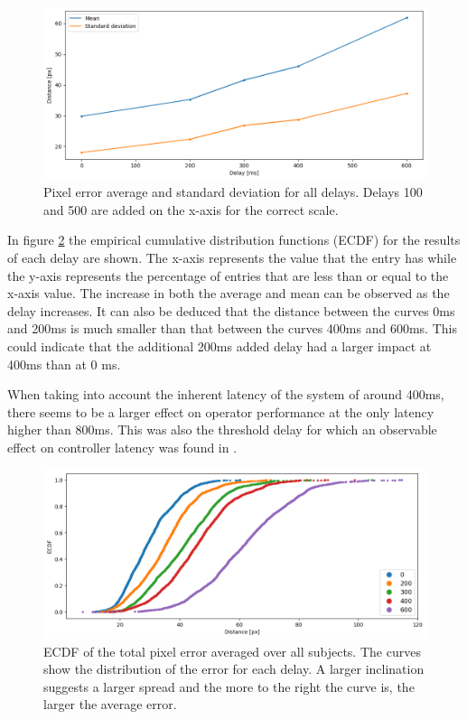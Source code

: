 \documentclass[nofilelist]{cslthse-msc}
\begin{document}
\begin{figure}[!hbt]
   \centering
   \includegraphics[scale=0.5]{images/avg-std.png} 
   \caption{Pixel error average and standard deviation for all delays. Delays 100 and 500 are added on the x-axis for the correct scale.}
   \label{fig:avg-std}
\end{figure}

In figure \ref{fig:ecdf} the empirical cumulative distribution functions (ECDF) for the results of each delay are shown. The x-axis represents the value that the entry has while the y-axis represents the percentage of entries that are less than or equal to the x-axis value. The increase in both the average and mean can be observed as the delay increases. It can also be deduced that the distance between the curves 0ms and 200ms is much smaller than that between the curves 400ms and 600ms. This could indicate that the additional 200ms added delay had a larger impact at 400ms than at 0 ms.

When taking into account the inherent latency of the system of around 400ms, there seems to be a larger effect on operator performance at the only latency higher than 800ms. This was also the threshold delay for which an observable effect on controller latency was found in \cite{latency-impact}.

\begin{figure}[!hbt]
   \centering
   \includegraphics[scale=0.5]{images/ecdf.png} 
   \caption{ECDF of the total pixel error averaged over all subjects. The curves show the distribution of the error for each delay. A larger inclination suggests a larger spread and the more to the right the curve is, the larger the average error.}
   \label{fig:ecdf}
\end{figure}
\end{document}
